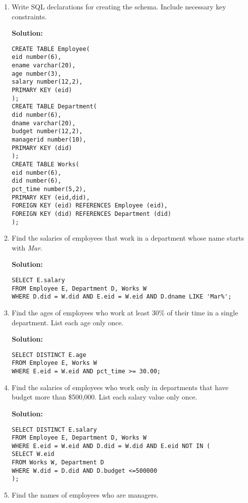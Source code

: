\begin{enumerate}
\item Write SQL declarations for creating the schema. Include necessary key constraints. 
  
\textbf{Solution:}
  
\begin{verbatim}
CREATE TABLE Employee(
eid number(6),
ename varchar(20),
age number(3),
salary number(12,2),
PRIMARY KEY (eid)
);
CREATE TABLE Department(
did number(6),
dname varchar(20),
budget number(12,2),
managerid number(10),
PRIMARY KEY (did)
);
CREATE TABLE Works(
eid number(6),
did number(6),
pct_time number(5,2),
PRIMARY KEY (eid,did),
FOREIGN KEY (eid) REFERENCES Employee (eid),
FOREIGN KEY (did) REFERENCES Department (did)
);
\end{verbatim}

\item Find the salaries of employees that work in a department whose name starts with \textit{Mar}.
  
\textbf{Solution:}

\begin{verbatim}
SELECT E.salary
FROM Employee E, Department D, Works W
WHERE D.did = W.did AND E.eid = W.eid AND D.dname LIKE 'Mar%';
\end{verbatim}

\item Find the ages of employees who work at least 30\% of their time in a single department. List each age only once.
  
\textbf{Solution:}

\begin{verbatim}
SELECT DISTINCT E.age
FROM Employee E, Works W
WHERE E.eid = W.eid AND pct_time >= 30.00;
\end{verbatim}

\item Find the salaries of employees who work only  in departments that have budget more than \$500,000. List each salary value only once.
  
\textbf{Solution:}
  
\begin{verbatim}
SELECT DISTINCT E.salary
FROM Employee E, Department D, Works W
WHERE E.eid = W.eid AND D.did = W.did AND E.eid NOT IN (
SELECT W.eid
FROM Works W, Department D
WHERE W.did = D.did AND D.budget <=500000
);
\end{verbatim}
  
\item Find the names of employees who are managers.
  

\end{enumerate}
